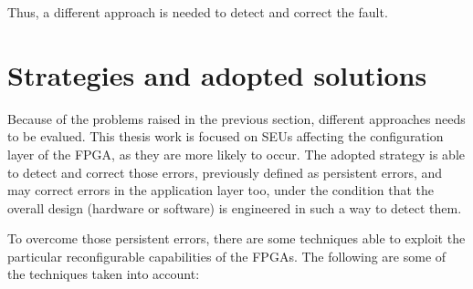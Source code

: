 Thus, a different approach is needed to detect and correct the fault.


\section{Strategies and adopted solutions}

Because of the problems raised in the previous section, different approaches needs to be evalued. This thesis work is focused on SEUs affecting the configuration layer of the FPGA, as they are more likely to occur. The adopted strategy is able to detect and correct those errors, previously defined as persistent errors, and may correct errors in the application layer too, under the condition that the overall design (hardware or software) is engineered in such a way to detect them. \bigskip

To overcome those persistent errors, there are some techniques able to exploit the particular reconfigurable capabilities of the FPGAs. The following are some of the techniques taken into account:

